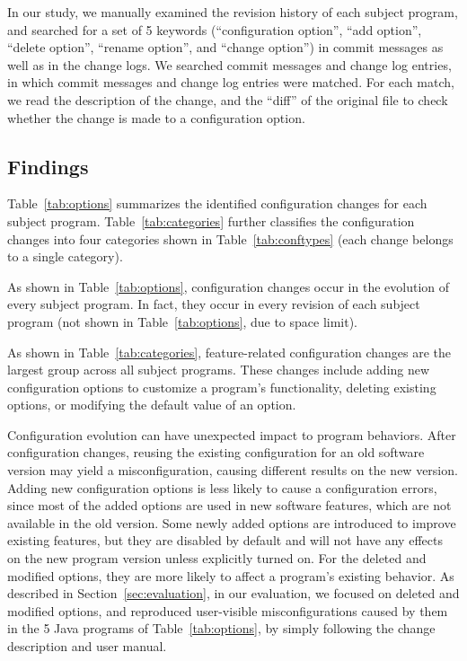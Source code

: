 In our study, %
we manually examined the revision history of each subject program,
and searched for a set of 5 keywords (``configuration option'', ``add option'',
``delete option'', ``rename option'', and ``change option'')
in commit messages as well as in the change logs.
We searched  commit messages and  change log entries, in
which  commit messages and  change log entries were matched.
For each match, we read the description of the change,
and the ``diff'' of the original file to check whether
the change is made to a configuration option.




\subsection{Findings}

Table~\ref{tab:options} summarizes the identified
configuration changes for each subject program.
Table~\ref{tab:categories} further classifies the
configuration changes into four categories shown
in Table~\ref{tab:conftypes} (each change belongs to a single category).


As shown in Table~\ref{tab:options}, configuration changes occur
in the evolution of every subject program. In fact, they occur in
every revision of each subject program (not shown in Table~\ref{tab:options},
due to space limit).  

As shown in Table~\ref{tab:categories},
feature-related configuration changes are the largest group across
all subject programs. These changes include
adding new configuration options to customize a program's
functionality, deleting existing options, or modifying the default
value of an option. 

Configuration evolution can have unexpected impact to
program behaviors. After configuration changes, reusing
the existing configuration for an old software version
may yield a misconfiguration, causing different results
on the new version. Adding
new configuration options is less likely to cause
a configuration errors, since most of the added options are
used in new software features, which are not available in
the old version. Some newly added options are introduced
to improve existing features, but they are disabled by
default and will not have any effects on the new program
version unless explicitly turned on. For the deleted
and modified options, they are more likely to affect a
program's existing behavior. As described in
Section~\ref{sec:evaluation}, in our evaluation,
we focused on deleted and modified options, and reproduced \errornum
user-visible misconfigurations caused by them
in the 5 Java programs of Table~\ref{tab:options},
by simply following the change description and user manual.


